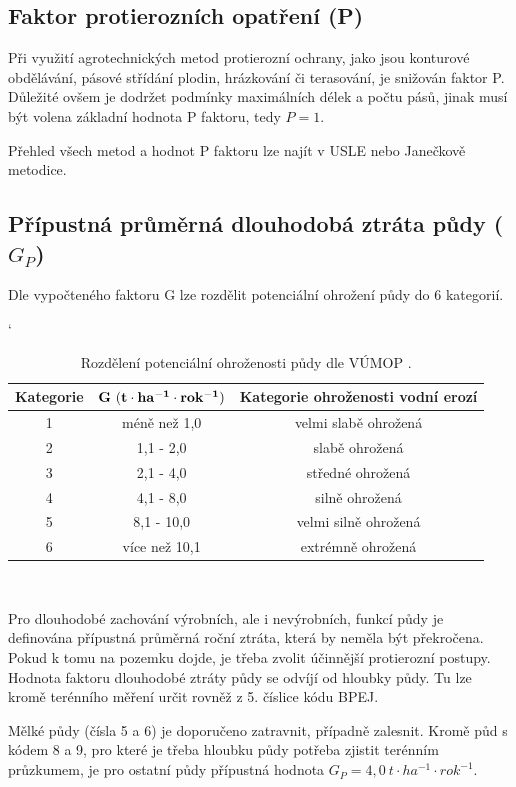 \subsection{Faktor protierozních opatření (P)}
Při využití agrotechnických metod protierozní ochrany, jako jsou
konturové obdělávání, pásové střídání plodin, hrázkování či
terasování, je snižován faktor P. Důležité ovšem je dodržet podmínky
maximálních délek a počtu pásů, jinak musí být volena základní hodnota
P faktoru, tedy $P=1$.

Přehled všech metod a hodnot P faktoru lze najít v USLE\cite{usle1978}
nebo Janečkově metodice\cite{janecek2012}.

\subsection{Přípustná průměrná dlouhodobá ztráta půdy ($G_P$)}
Dle vypočteného faktoru G lze rozdělit potenciální ohrožení půdy do 6
kategorií.\cite{vumop}

\begin{table}[!h]
\begin{center}
\catcode`
    \noindent\begin{tabular}{|*{3}{c|}} \hline \bf Kategorie & \bf
    $\bf G~(t\cdot ha^{-1}\cdot rok^{-1})$ & \bf Kategorie ohroženosti
    vodní erozí\\ \hline 1 & méně než 1,0 & velmi slabě
    ohrožená\\ \hline 2 & 1,1 - 2,0 & slabě ohrožená\\ \hline 3 & 2,1
    - 4,0 & středné ohrožená\\ \hline 4 & 4,1 - 8,0 & silně
    ohrožená\\ \hline 5 & 8,1 - 10,0 & velmi silně ohrožená\\ \hline 6
    & více než 10,1 & extrémně ohrožená\\ \hline
    \end{tabular}\\
  \caption[Rozdělení potenciální ohroženosti půdy]{Rozdělení
    potenciální ohroženosti půdy dle VÚMOP \cite{vumop}.}
  \label{tabulka_ohrozenost}
\end{center}
\end{table}
\FloatBarrier Pro dlouhodobé zachování výrobních, ale i nevýrobních,
funkcí půdy je definována přípustná průměrná roční ztráta, která by
neměla být překročena. Pokud k tomu na pozemku dojde, je třeba zvolit
účinnější protierozní postupy. Hodnota faktoru dlouhodobé ztráty půdy
se odvíjí od hloubky půdy. Tu lze kromě terénního měření určit rovněž
z 5. číslice kódu BPEJ.\cite{janecek2012}

Mělké půdy (čísla 5 a 6) je doporučeno zatravnit, případně
zalesnit. Kromě půd s kódem 8 a 9, pro které je třeba hloubku půdy
potřeba zjistit terénním průzkumem, je pro ostatní půdy přípustná
hodnota $G_P=4,0~t\cdot ha^{-1}\cdot rok^{-1}$.\cite{Novotny2014}
